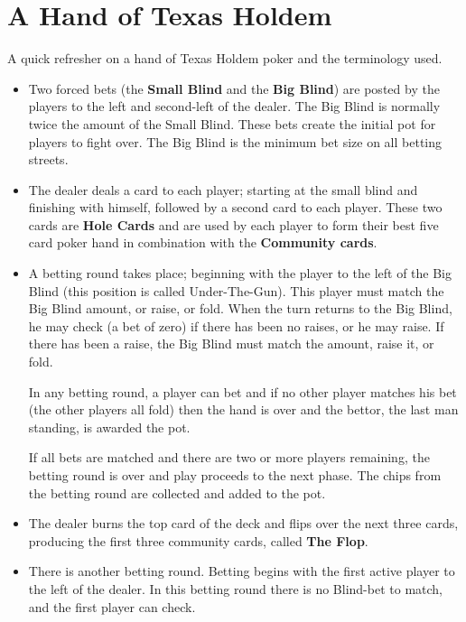 \chapter{A Hand of Texas Holdem}


A quick refresher on a hand of Texas Holdem poker and the terminology
used.

\begin{itemize}

\item Two forced bets (the \textbf{Small Blind} and the \textbf{Big
  Blind}) are posted by   the players to the left and second-left of
  the dealer. The Big Blind   is normally twice the amount of the
  Small Blind. These bets create the initial pot for players to
  fight over. The Big Blind is the minimum bet size on all betting streets.
  
\item The dealer deals a card to each player; starting at the small
  blind and finishing with himself, followed by a second card to each
  player. These two cards are \textbf{Hole Cards} and are used by each
  player to form their best five card poker hand in combination with
  the \textbf{Community cards}.
  
\item A betting round takes place; beginning with the player to the
  left of the Big Blind (this position is called Under-The-Gun). This
  player must match the Big Blind amount, or raise, or fold. When the
  turn returns to the Big Blind, he may check (a bet of zero) if there
  has been no raises, or he may raise. If there has been a raise, the
  Big Blind must match the amount, raise it, or fold.

  In any betting round, a player can bet and if no other player
  matches his bet (the other players all fold) then the hand is over
  and the bettor, the last man standing, is awarded the pot.

  If all bets are matched and there are two or more players remaining,
  the betting round is over and play proceeds to the next phase.
  The chips from the betting round are collected and added to the pot.

\item The dealer burns the top card of the deck and flips over the
  next three cards, producing the first three community cards, called
  \textbf{The Flop}.

\item There is another betting round. Betting begins with the first
  active player to the left of the dealer. In this betting round there
  is no Blind-bet to match, and the first player can check.


\end{itemize}

